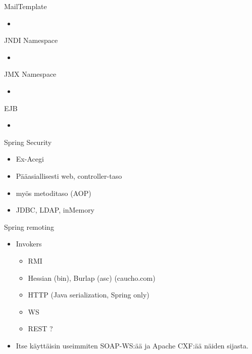 \documentclass[hyperref={pdfauthor=\AUTHOR},14pt]{beamer}
\begin{document}
\begin{frame}{MailTemplate}
\begin{itemize}
\item 
\end{itemize}
\end{frame}

\begin{frame}{JNDI}
Namespace
\begin{itemize}
\item 
\end{itemize}
\end{frame}

\begin{frame}{JMX}
Namespace
\begin{itemize}
\item 
\end{itemize}
\end{frame}

\begin{frame}{EJB}
\begin{itemize}
\item 
\end{itemize}
\end{frame}



\begin{frame}{Spring Security}
\begin{itemize}
\item Ex-Acegi
\item Pääasiallisesti web, controller-taso
\item myös metoditaso (AOP)
\item JDBC, LDAP, inMemory
\end{itemize}
\end{frame}

\begin{frame}{Spring remoting}
\begin{itemize}
\item Invokers
\begin{itemize}
\item RMI
\item Hessian (bin), Burlap (asc) (caucho.com)
\item HTTP (Java serialization, Spring only)
\item WS
\item REST ?
\end{itemize}
\item Itse käyttäisin useimmiten SOAP-WS:ää ja Apache CXF:ää näiden
  sijasta.

\end{itemize}
\end{frame}
\end{document}

